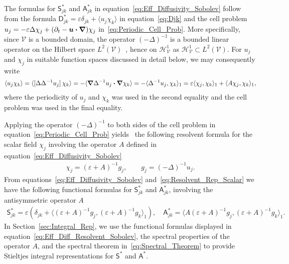 \documentclass[leqno,onefignum,onetabnum]{siamltex1213}
\newcommand{\secref}[1]{Section~\ref{#1}}
\newcommand{\Vc}{\mathcal{V}}
\newcommand{\Dm}{\mathsf{D}}
\newcommand{\Sm}{\mathsf{S}}
\newcommand{\Am}{\mathsf{A}}
\newcommand{\Hs}{\mathscr{H}}
\newcommand\bnabla{\mbox{\boldmath${\nabla}$}}
\providecommand\bcdot{\boldsymbol{\cdot}}
\newcommand{\vecu}{\boldsymbol{u}}
\begin{document}
The formulas for $\Sm^*_{jk}$ and $\Am^*_{jk}$ in 
equation~\eqref{eq:Eff_Diffusivity_Sobolev}
follow~\cite{Pavliotis:PHD_Thesis}  
from the formula $\Dm^*_{jk}=\varepsilon\delta_{jk}+\langle u_j\chi_k\rangle$ in
equation~\eqref{eq:Djk} and the cell problem
$u_j=-\varepsilon\Delta\chi_j+(\partial_t-\vecu\bcdot\bnabla)\chi_j$
in~\eqref{eq:Periodic_Cell_Prob}. More  
specifically, since $\Vc$ is a bounded domain, the operator
$(-\Delta)^{-1}$ is a bounded linear operator on the Hilbert space
$L^2(\Vc)$~\cite{Stakgold:BVP:2000}, hence on $\Hs^1_{\Vc}$ as
$\Hs^1_{\Vc}\subset L^2(\Vc)$. For $u_j$ and $\chi_j$ in suitable function
spaces discussed in detail below, we may consequently write
%
\begin{align}\label{eq:uj_chik}
  \langle u_j\chi_k\rangle=\langle[\Delta\Delta^{-1}u_j]\,\chi_k\rangle
       =-\langle\bnabla \Delta^{-1}u_j\bcdot\bnabla \chi_k\rangle
       =-\langle\Delta^{-1}u_j,\chi_k\rangle_1
       =\varepsilon\langle\chi_j,\chi_k\rangle_1+\langle A\chi_j,\chi_k\rangle_1,
\end{align}
%
where the periodicity of $u_j$ and $\chi_k$ was used in the second
equality and the cell problem was used in the final equality.




Applying the operator $(-\Delta)^{-1}$ to both sides of the cell problem in
equation~\eqref{eq:Periodic_Cell_Prob}
yields~\cite{Pavliotis:PHD_Thesis} the following resolvent formula for
the scalar field $\chi_j$ involving the operator $A$
defined in equation~\eqref{eq:Eff_Diffusivity_Sobolev}
%
\begin{align}\label{eq:Resolvent_Rep_Scalar}
  \chi_j=(\varepsilon+A)^{-1}g_j, \qquad 
  g_j=(-\Delta)^{-1}u_j.
\end{align}
%
From equations~\eqref{eq:Eff_Diffusivity_Sobolev}
and~\eqref{eq:Resolvent_Rep_Scalar} we have the following functional
formulas for $\Sm^*_{jk}$ and $\Am^*_{jk}$, involving the antisymmetric
operator $A$
%
\begin{align}\label{eq:Eff_Diff_Resolvent_Sobolev}
 \Sm^*_{jk}=\varepsilon\left(\delta_{jk}+\langle(\varepsilon+A)^{-1}g_j,(\varepsilon+A)^{-1}g_k\rangle_1\right), \quad
 \Am^*_{jk}=\langle A(\varepsilon+A)^{-1}g_j,(\varepsilon+A)^{-1}g_k\rangle_1.
\end{align}
%
In \secref{sec:Integral_Rep}, we use the functional formulas displayed
in equation~\eqref{eq:Eff_Diff_Resolvent_Sobolev}, the spectral
properties of the operator $A$, and the spectral theorem
in~\eqref{eq:Spectral_Theorem} to provide Stieltjes integral
representations for $\Sm^*$ and $\Am^*$. 
\end{document}
